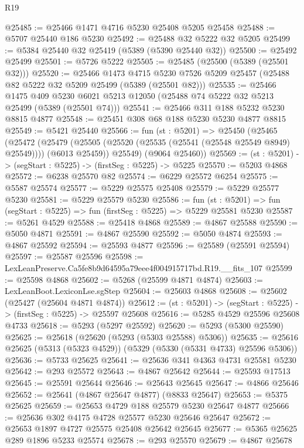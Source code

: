 \begin{lexlean}{R19}
\begin{coremodule}
@25485 := @25466 @1471 @4716 @5230 @25408 @5205 @25458
@25488 := @5707 @25440 @186 @5230
@25492 := @25488 @32 @5222 @32 @5205
@25499 := @5384 @25440 @32 @25419 (@5389 (@5390 @25440 @32))
@25500 := @25492 @25499
@25501 := @5726 @5222
@25505 := @25485 (@25500 (@5389 (@25501 @32)))
@25520 := @25466
    @1473
    @4715
    @5230
    @7526
    @5209
    @25457
    (@25488 @82 @5222 @32 @5209 @25499 (@5389 (@25501 @82)))
@25535 := @25466
    @1475
    @409
    @5230
    @6021
    @5213
    @12050
    (@25488 @74 @5222 @32 @5213 @25499 (@5389 (@25501 @74)))
@25541 := @25466 @311 @188 @5232 @5230 @8815 @4877
@25548 := @25451 @308 @68 @188 @5230 @5230 @4877 @8815
@25549 := @5421 @25440
@25566 := fun (st : @5201) =>
  @25450
    (@25465
      (@25472
        (@25479 (@25505 (@25520 (@25535 (@25541 (@25548 @25549 @8949) @25549)))) (@6013 @25459))
        @25549)
      (@9064 @25460))
@25569 := (st : @5201) -> (segStart : @5225) -> (firstSeg : @5225) -> @5225
@25570 := @5203 @4868
@25572 := @6238 @25570 @82
@25574 := @6229 @25572 @6254
@25575 := @5587 @25574
@25577 := @5229 @25575 @25408
@25579 := @5229 @25577 @5230
@25581 := @5229 @25579 @5230
@25586 := fun (st : @5201) => fun (segStart : @5225) => fun (firstSeg : @5225) => @5229 @25581 @5230
@25587 := @5261 @4529
@25588 := @25418 @4868
@25589 := @4867 @25588
@25590 := @5050 @4871
@25591 := @4867 @25590
@25592 := @5050 @4874
@25593 := @4867 @25592
@25594 := @25593 @4877
@25596 := @25589 (@25591 @25594)
@25597 := @25587 @25596
@25598 := LexLeanPreserve.Ca5fe8b9d64595a79eee4f004915717bd.R19.__fits_107
@25599 := @25598 @4868
@25602 := @5268 (@25599 @4871 @4874)
@25603 := LexLeanBoot.LexiconLse.sgStep
@25604 := @25603 @4868
@25608 := @25602 (@25427 (@25604 @4871 @4874))
@25612 := (st : @5201) -> (segStart : @5225) -> (firstSeg : @5225) -> @25597 @25608
@25616 := @5285 @4529 @25596 @25608 @4733
@25618 := @5293 (@5297 @25592)
@25620 := @5293 (@5300 @25590)
@25625 := @25618 (@25620 (@5293 (@5303 @25588) @5306))
@25635 := @25616 @25625 (@5313 (@5323 @4529)) (@5329 (@5330 (@5331 @4733) @25596 @5306))
@25636 := @5733 @25625
@25641 := @25636 @341 @4363 @4731 @25581 @5230
@25642 := @293 @25572
@25643 := @4867 @25642
@25644 := @25593 @17513
@25645 := @25591 @25644
@25646 := @25643 @25645
@25647 := @4866 @25646
@25652 := @25641 (@4867 @25647 @4877) (@8833 @25647)
@25653 := @5375 @25625
@25659 := @25653 @4729 @188 @25579 @5230 @25647 @4877
@25666 := @25636 @302 @4175 @4728 @25577 @5230 @25646 @25647
@25672 := @25653 @1897 @4727 @25575 @25408 @25642 @25645
@25677 := @5365 @25625 @289 @1896 @5233 @25574
@25678 := @293 @25570
@25679 := @4867 @25678

\end{coremodule}
\end{lexlean}
